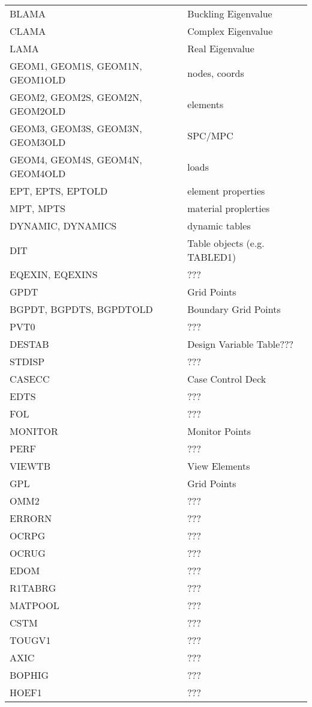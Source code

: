 \begin{tabular}{ll}
    BLAMA & Buckling Eigenvalue \\
    CLAMA & Complex Eigenvalue  \\
    LAMA  & Real Eigenvalue     \\

    GEOM1, GEOM1S, GEOM1N, GEOM1OLD & nodes, coords \\
    GEOM2, GEOM2S, GEOM2N, GEOM2OLD & elements      \\
    GEOM3, GEOM3S, GEOM3N, GEOM3OLD & SPC/MPC       \\
    GEOM4, GEOM4S, GEOM4N, GEOM4OLD & loads         \\
    EPT, EPTS, EPTOLD & element properties          \\
    MPT, MPTS         & material proplerties        \\

    DYNAMIC, DYNAMICS & dynamic tables               \\
    DIT               & Table objects (e.g. TABLED1) \\

    EQEXIN, EQEXINS & ??? \\

    GPDT                     & Grid Points          \\
    BGPDT, BGPDTS, BGPDTOLD  & Boundary Grid Points \\

    PVT0    & ???                      \\
    DESTAB  & Design Variable Table??? \\
    STDISP  & ???                      \\
    CASECC  & Case Control Deck        \\

    EDTS     & ???            \\
    FOL      & ???            \\
    MONITOR  & Monitor Points \\
    PERF     & ???            \\
    VIEWTB   & View Elements  \\

    GPL     & Grid Points \\
    OMM2    & ???         \\
    ERRORN  & ???         \\
    OCRPG   & ???         \\
    OCRUG   & ???         \\
    EDOM    & ???         \\
    R1TABRG & ???         \\
    MATPOOL & ???         \\
    CSTM    & ???         \\
    TOUGV1  & ???         \\
    AXIC    & ???         \\
    BOPHIG  & ???         \\
    HOEF1   & ???         \\



\end{tabular}
